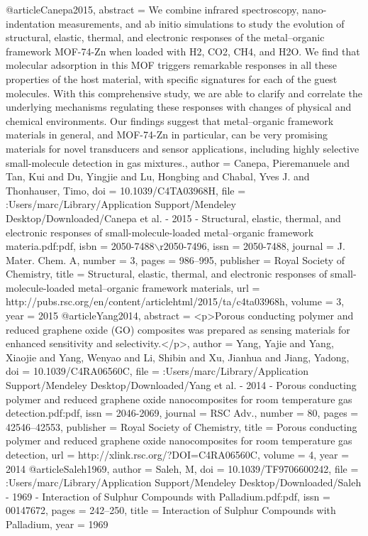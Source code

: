 @article{Canepa2015,
abstract = {We combine infrared spectroscopy, nano-indentation measurements, and ab initio simulations to study the evolution of structural, elastic, thermal, and electronic responses of the metal–organic framework MOF-74-Zn when loaded with H2, CO2, CH4, and H2O. We find that molecular adsorption in this MOF triggers remarkable responses in all these properties of the host material, with specific signatures for each of the guest molecules. With this comprehensive study, we are able to clarify and correlate the underlying mechanisms regulating these responses with changes of physical and chemical environments. Our findings suggest that metal–organic framework materials in general, and MOF-74-Zn in particular, can be very promising materials for novel transducers and sensor applications, including highly selective small-molecule detection in gas mixtures.},
author = {Canepa, Pieremanuele and Tan, Kui and Du, Yingjie and Lu, Hongbing and Chabal, Yves J. and Thonhauser, Timo},
doi = {10.1039/C4TA03968H},
file = {:Users/marc/Library/Application Support/Mendeley Desktop/Downloaded/Canepa et al. - 2015 - Structural, elastic, thermal, and electronic responses of small-molecule-loaded metal–organic framework materia.pdf:pdf},
isbn = {2050-7488$\backslash$r2050-7496},
issn = {2050-7488},
journal = {J. Mater. Chem. A},
number = {3},
pages = {986--995},
publisher = {Royal Society of Chemistry},
title = {{Structural, elastic, thermal, and electronic responses of small-molecule-loaded metal–organic framework materials}},
url = {http://pubs.rsc.org/en/content/articlehtml/2015/ta/c4ta03968h},
volume = {3},
year = {2015}
}
@article{Yang2014,
abstract = {{\textless}p{\textgreater}Porous conducting polymer and reduced graphene oxide (GO) composites was prepared as sensing materials for enhanced sensitivity and selectivity.{\textless}/p{\textgreater}},
author = {Yang, Yajie and Yang, Xiaojie and Yang, Wenyao and Li, Shibin and Xu, Jianhua and Jiang, Yadong},
doi = {10.1039/C4RA06560C},
file = {:Users/marc/Library/Application Support/Mendeley Desktop/Downloaded/Yang et al. - 2014 - Porous conducting polymer and reduced graphene oxide nanocomposites for room temperature gas detection.pdf:pdf},
issn = {2046-2069},
journal = {RSC Adv.},
number = {80},
pages = {42546--42553},
publisher = {Royal Society of Chemistry},
title = {{Porous conducting polymer and reduced graphene oxide nanocomposites for room temperature gas detection}},
url = {http://xlink.rsc.org/?DOI=C4RA06560C},
volume = {4},
year = {2014}
}
@article{Saleh1969,
author = {Saleh, M},
doi = {10.1039/TF9706600242},
file = {:Users/marc/Library/Application Support/Mendeley Desktop/Downloaded/Saleh - 1969 - Interaction of Sulphur Compounds with Palladium.pdf:pdf},
issn = {00147672},
pages = {242--250},
title = {{Interaction of Sulphur Compounds with Palladium}},
year = {1969}
}
